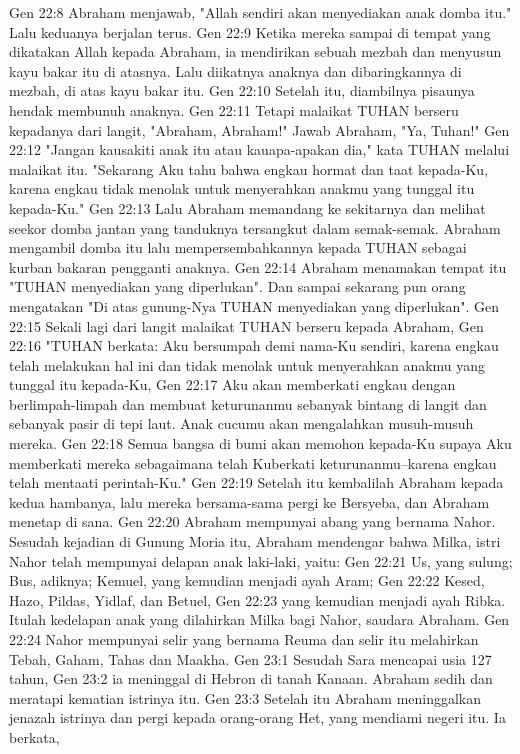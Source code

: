 Gen 22:8  Abraham menjawab, "Allah sendiri akan menyediakan anak domba itu." Lalu keduanya berjalan terus.
Gen 22:9  Ketika mereka sampai di tempat yang dikatakan Allah kepada Abraham, ia mendirikan sebuah mezbah dan menyusun kayu bakar itu di atasnya. Lalu diikatnya anaknya dan dibaringkannya di mezbah, di atas kayu bakar itu.
Gen 22:10  Setelah itu, diambilnya pisaunya hendak membunuh anaknya.
Gen 22:11  Tetapi malaikat TUHAN berseru kepadanya dari langit, "Abraham, Abraham!" Jawab Abraham, "Ya, Tuhan!"
Gen 22:12  "Jangan kausakiti anak itu atau kauapa-apakan dia," kata TUHAN melalui malaikat itu. "Sekarang Aku tahu bahwa engkau hormat dan taat kepada-Ku, karena engkau tidak menolak untuk menyerahkan anakmu yang tunggal itu kepada-Ku."
Gen 22:13  Lalu Abraham memandang ke sekitarnya dan melihat seekor domba jantan yang tanduknya tersangkut dalam semak-semak. Abraham mengambil domba itu lalu mempersembahkannya kepada TUHAN sebagai kurban bakaran pengganti anaknya.
Gen 22:14  Abraham menamakan tempat itu "TUHAN menyediakan yang diperlukan". Dan sampai sekarang pun orang mengatakan "Di atas gunung-Nya TUHAN menyediakan yang diperlukan".
Gen 22:15  Sekali lagi dari langit malaikat TUHAN berseru kepada Abraham,
Gen 22:16  "TUHAN berkata: Aku bersumpah demi nama-Ku sendiri, karena engkau telah melakukan hal ini dan tidak menolak untuk menyerahkan anakmu yang tunggal itu kepada-Ku,
Gen 22:17  Aku akan memberkati engkau dengan berlimpah-limpah dan membuat keturunanmu sebanyak bintang di langit dan sebanyak pasir di tepi laut. Anak cucumu akan mengalahkan musuh-musuh mereka.
Gen 22:18  Semua bangsa di bumi akan memohon kepada-Ku supaya Aku memberkati mereka sebagaimana telah Kuberkati keturunanmu--karena engkau telah mentaati perintah-Ku."
Gen 22:19  Setelah itu kembalilah Abraham kepada kedua hambanya, lalu mereka bersama-sama pergi ke Bersyeba, dan Abraham menetap di sana.
Gen 22:20  Abraham mempunyai abang yang bernama Nahor. Sesudah kejadian di Gunung Moria itu, Abraham mendengar bahwa Milka, istri Nahor telah mempunyai delapan anak laki-laki, yaitu:
Gen 22:21  Us, yang sulung; Bus, adiknya; Kemuel, yang kemudian menjadi ayah Aram;
Gen 22:22  Kesed, Hazo, Pildas, Yidlaf, dan Betuel,
Gen 22:23  yang kemudian menjadi ayah Ribka. Itulah kedelapan anak yang dilahirkan Milka bagi Nahor, saudara Abraham.
Gen 22:24  Nahor mempunyai selir yang bernama Reuma dan selir itu melahirkan Tebah, Gaham, Tahas dan Maakha.
Gen 23:1  Sesudah Sara mencapai usia 127 tahun,
Gen 23:2  ia meninggal di Hebron di tanah Kanaan. Abraham sedih dan meratapi kematian istrinya itu.
Gen 23:3  Setelah itu Abraham meninggalkan jenazah istrinya dan pergi kepada orang-orang Het, yang mendiami negeri itu. Ia berkata,
